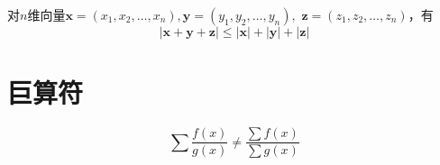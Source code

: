 对$n$维向量$\pmb{x}=(x_1,x_2,\dots,x_n),\pmb{y}=(y_1,y_2,\dots,y_n),$
$\pmb{z}=(z_1,z_2,\dots,z_n)$，有
\begin{equation}
	|\pmb{x}+\pmb{y}+\pmb{z}| \leq |\pmb{x}|+|\pmb{y}|+|\pmb{z}|
\end{equation}

\section{巨算符} \label{giant-operator}

\cite[page A36]{stewart}
\[
    \sum \dfrac{f(x)}{g(x)} \neq \dfrac{\sum f(x)}{\sum g(x)}
\]

